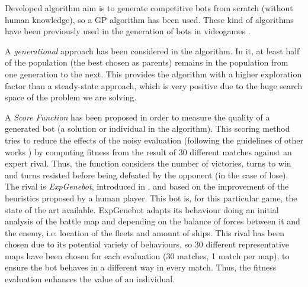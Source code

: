 \documentclass[runningheads,a4paper]{llncs}
\begin{document}

Developed algorithm aim is to generate competitive bots from scratch (without human knowledge), so a GP algorithm has been used. These kind of algorithms have been previously used in the generation of bots in videogames \cite{Esparcia2013GPunreal,Harper2014403,IWINAC:DecisionTreeUT2004}. 

A \textit{generational} approach has been considered in the algorithm. 
In it, at least half of the population (the best chosen as parents)
remains in the population from one generation to the next. This provides the algorithm with a higher exploration factor than a steady-state approach, which is very positive due to the huge search space of the problem we are solving.


A \textit{Score Function} has been proposed in order to measure the quality of a generated bot (a solution or individual in the algorithm). This scoring method tries to reduce the effects of the noisy evaluation (following the guidelines of other works \cite{DBLP:journals/jcst/MoraFGGF12}) by computing fitness from the result of 30 different matches against an expert rival.
Thus, the function considers the number of victories, turns to win and turns resisted before being defeated by the opponent (in the case of lose). The rival is \textit{ExpGenebot}, introduced in
\cite{DBLP:conf/cig/Fernandez-AresGMG12}, and based on the improvement of the heuristics proposed by a human player. This bot is, for this particular game, the state of the art available. ExpGenebot adapts its behaviour doing an initial analysis
of the battle map and depending on the balance of forces between it and the enemy, i.e. location of the fleets and amount of ships.
This rival has been chosen due to its potential variety of behaviours,
so 30 different representative maps have been chosen for each
evaluation (30 matches, 1 match per map), to ensure the bot behaves in a different way in every match. Thus, the fitness evaluation enhances the value of an individual. 
\end{document}
